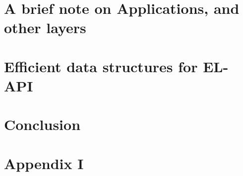 \documentclass[11pt]{article}
\begin{document}
\section{A brief note on Applications, and other layers}

\section{Efficient data structures for EL-API}



\section{Conclusion}

\section{Appendix I}
\end{document}

